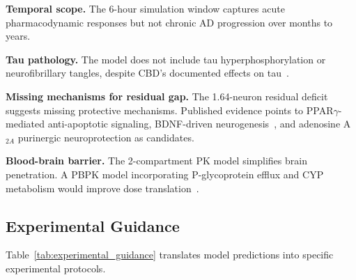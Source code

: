 \documentclass[10pt,letterpaper]{article}
\begin{document}
\vspace{3pt}
\noindent\textbf{Temporal scope.} The 6-hour simulation window captures acute pharmacodynamic responses but not chronic AD progression over months to years.

\vspace{3pt}
\noindent\textbf{Tau pathology.} The model does not include tau hyperphosphorylation or neurofibrillary tangles, despite CBD's documented effects on tau~\cite{esposito2006tau}.

\vspace{3pt}
\noindent\textbf{Missing mechanisms for residual gap.} The 1.64-neuron residual deficit suggests missing protective mechanisms. Published evidence points to PPAR$\gamma$-mediated anti-apoptotic signaling, BDNF-driven neurogenesis~\cite{esposito2011}, and adenosine A$_{2A}$ purinergic neuroprotection as candidates.

\vspace{3pt}
\noindent\textbf{Blood-brain barrier.} The 2-compartment PK model simplifies brain penetration. A PBPK model incorporating P-glycoprotein efflux and CYP metabolism would improve dose translation~\cite{millar2018}.

\subsection{Experimental Guidance}

Table~\ref{tab:experimental_guidance} translates model predictions into specific experimental protocols.
\end{document}
